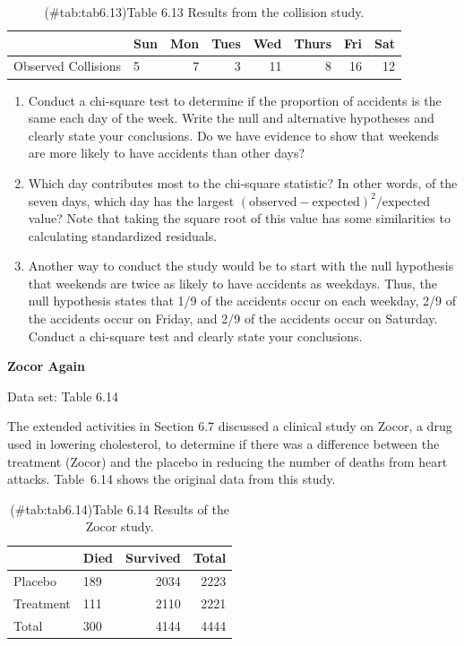 \documentclass[
]{report}
\begin{document}
\begin{list}{E.}{ \setlength{\itemsep}{0.5em}}
\begin{table}[!h]
\centering
\caption{(\#tab:tab6.13)Table 6.13 Results from the collision study.}
\centering
\begin{tabular}[t]{llrrrrrr}
\toprule
  & Sun & Mon & Tues & Wed & Thurs & Fri & Sat\\
\midrule
Observed Collisions & 5 & 7 & 3 & 11 & 8 & 16 & 12\\
\bottomrule
\end{tabular}
\end{table}
  \begin{enumerate}
    \item Conduct a chi-square test to determine if the proportion of accidents is the same each day of the week. Write the null and alternative hypotheses and clearly state your conclusions. Do we have evidence to show that weekends are more likely to have accidents than other days?
    \item Which day contributes most to the chi-square statistic? In other words, of the seven days, which day has the largest \((\text{observed} - \text{expected})^2/\text{expected}\) value? Note that taking the square root of
this value has some similarities to calculating standardized residuals.
    \item Another way to conduct the study would be to start with the null hypothesis that weekends are twice as likely to have accidents as weekdays. Thus, the null hypothesis states that 1/9 of the accidents occur on each weekday, 2/9 of the accidents occur on Friday, and 2/9 of the accidents occur on Saturday. Conduct a chi-square test and clearly state your conclusions.
  \end{enumerate}

  \item \textbf{Zocor Again}    

  Data set: Table 6.14    
  
  The extended activities in Section 6.7 discussed a clinical study on Zocor, a drug used in lowering cholesterol, to determine if there was a difference between the treatment (Zocor) and the placebo in reducing the number of deaths from heart attacks. Table 6.14 shows the original data from this study.  
  
\begin{table}[!h]
\centering
\caption{(\#tab:tab6.14)Table 6.14 Results of the Zocor study.}
\centering
\begin{tabular}[t]{llrr}
\toprule
  & Died & Survived & Total\\
\midrule
Placebo & 189 & 2034 & 2223\\
Treatment & 111 & 2110 & 2221\\
Total & 300 & 4144 & 4444\\
\bottomrule
\end{tabular}
\end{table}
  

\end{list}
\end{document}
